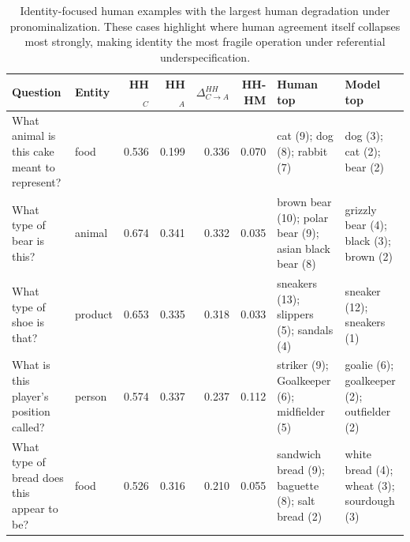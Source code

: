 \begin{table}[t]
\centering
\caption{Identity-focused human examples with the largest human degradation under pronominalization. These cases highlight where human agreement itself collapses most strongly, making identity the most fragile operation under referential underspecification.}
\label{tab:identity_focus_examples}
\small
\begin{tabular}{llrrrrll}
\toprule
Question & Entity & HH$_C$ & HH$_A$ & $\Delta_{C\to A}^{HH}$ & HH-HM & Human top & Model top \\
\midrule
What animal is this cake meant to represent? & food & 0.536 & 0.199 & 0.336 & 0.070 & cat (9); dog (8); rabbit (7) & dog (3); cat (2); bear (2) \\
What type of bear is this? & animal & 0.674 & 0.341 & 0.332 & 0.035 & brown bear (10); polar bear (9); asian black bear (8) & grizzly bear (4); black (3); brown (2) \\
What type of shoe is that? & product & 0.653 & 0.335 & 0.318 & 0.033 & sneakers (13); slippers (5); sandals (4) & sneaker (12); sneakers (1) \\
What is this player's position called? & person & 0.574 & 0.337 & 0.237 & 0.112 & striker (9); Goalkeeper (6); midfielder (5) & goalie (6); goalkeeper (2); outfielder (2) \\
What type of bread does this appear to be? & food & 0.526 & 0.316 & 0.210 & 0.055 & sandwich bread (9); baguette (8); salt bread (2) & white bread (4); wheat (3); sourdough (3) \\
\bottomrule
\end{tabular}
\end{table}

